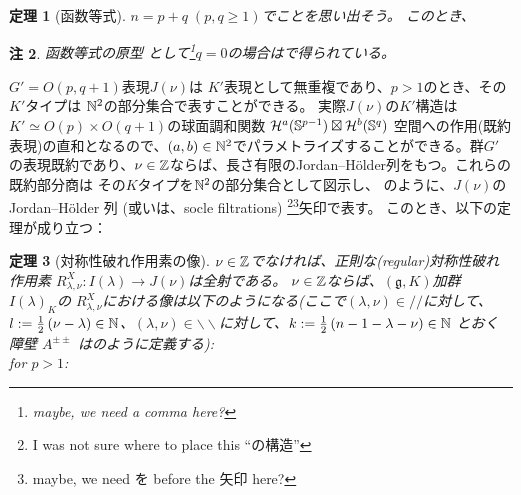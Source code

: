 \documentclass[12pt]{article} %
\newtheorem{theorem}{定理}
\newtheorem{remark}[theorem]{注}
\theoremstyle{definition}
\theoremstyle{exampstyle} \newtheorem{examp}[theorem]{Theorem}
\newcommand{\doubt}[1]{\uwave{#1}}
\begin{document}
	\begin{theorem}[函数等式]
		$n=p+q\;(p,q\ge1)$で\doubt{あった}ことを思い出そう。
	このとき、
	\end{theorem}
	\begin{remark}
		函数等式の原型
		として\footnote{maybe, we need a comma here?}$q=0$の場合は\cite[Thm. 12.6]{kobayashi2015program}で得られている。
	\end{remark}
	$G'=O(p,q+1)$表現$J(\nu)$は $K'$表現として無重複であり、$p>1$のとき、その$K'$タイプは $\mathbb{N}^2$の部分集合で表すことができる。
	実際$J(\nu)$の$K'$構造は$K'\simeq O(p)\times O(q+1)$の球面調和関数
	$\mathcal{H}^a(\mathbb{S}^{p-1})\boxtimes\mathcal{H}^b(\mathbb{S}^q)$
	空間への作用(既約表現)の直和となるので、$(a,b)\in\mathbb{N}^2$でパラメトライズすることができる。群$G'$の表現既約であり、$\nu\in\mathbb{Z}$ならば、長さ有限のJordan--H\"older列をもつ。これらの既約部分商は\doubt{、}
	その$K$タイプを$\mathbb{N}^2$の部分集合として図示し、
	\cite{howe1993homogeneous}のように、$J(\nu)$のJordan--H\"older 列 (或いは、socle filtrations) \doubt{の構造}\footnote{I was not sure where to place this ``の構造''}\footnote{maybe, we need を before
	the 矢印 here?}矢印で表す。
	このとき、以下の定理が成り立つ：
\begin{theorem}[対称性破れ作用素の像]
	$\nu\in\mathbb{Z}$でなければ、正則な(regular)対称性破れ作用素 $R_{\lambda,\nu}^X:I(\lambda)\to J(\nu)$は全射である。
	$\nu\in\mathbb{Z}$ならば、$(\mathfrak{g},K)$加群 $I(\lambda)_K$の
	$R_{\lambda,\nu}^X$における像は以下のようになる(ここで$(\lambda,\nu)\in//$に対して、
	$l:=\frac{1}{2}\left( \nu-\lambda \right)\in\mathbb{N}$、$(\lambda,\nu)\in\backslash\backslash$に対して、$k:=\frac{1}{2}\left( n-1-\lambda-\nu \right)
	\in\mathbb{N}$ とおく\doubt{。} 障壁 $A^{\pm\pm}$
	は\cite{howe1993homogeneous}のように定義する): \\
	for $p>1$:
\end{theorem}
\end{document}
